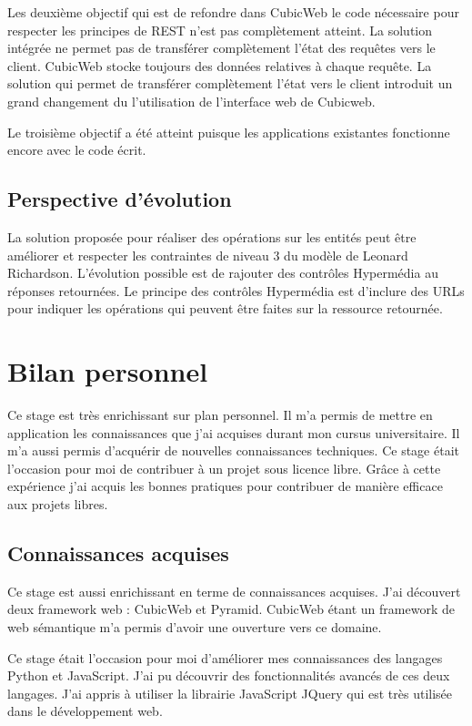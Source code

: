 Les deuxième objectif qui est de refondre dans CubicWeb le code nécessaire pour
respecter les principes de REST n'est pas complètement atteint. La solution
intégrée ne permet pas de transférer complètement l'état des requêtes vers le
client. CubicWeb stocke toujours des données relatives à chaque requête. La
solution qui permet de transférer complètement l'état vers le client introduit
un grand changement du l'utilisation de l'interface web de Cubicweb. 

Le troisième objectif a été atteint puisque les applications existantes
fonctionne encore avec le code écrit.

\subsection{Perspective d'évolution} 
La solution proposée pour réaliser des opérations  sur les 
entités peut être améliorer et respecter les contraintes de niveau 3 du modèle 
de Leonard Richardson. L'évolution possible est de rajouter des contrôles 
Hypermédia au réponses retournées. Le principe des contrôles Hypermédia est 
d'inclure des URLs pour indiquer les opérations qui peuvent être faites sur la 
ressource retournée. 

\section{Bilan personnel} 
Ce stage est très enrichissant sur plan personnel. Il m'a permis de mettre en 
application les connaissances que j'ai acquises durant mon cursus universitaire. 
Il m'a aussi permis d'acquérir de nouvelles connaissances techniques. Ce stage était 
l'occasion pour moi de contribuer à un projet sous licence libre. Grâce à cette 
expérience j'ai acquis les bonnes pratiques pour contribuer de manière efficace aux 
projets libres.

\subsection{Connaissances acquises} 
Ce stage est aussi enrichissant en terme de connaissances acquises. J'ai découvert 
deux framework web : CubicWeb et Pyramid. CubicWeb étant un framework de web 
sémantique m'a permis d'avoir une ouverture vers ce domaine. 

Ce stage était l'occasion pour moi d'améliorer mes connaissances des langages
Python et JavaScript. J'ai pu découvrir des fonctionnalités avancés de ces deux
langages. J'ai appris à utiliser la librairie JavaScript JQuery qui est très
utilisée dans le développement web. 

